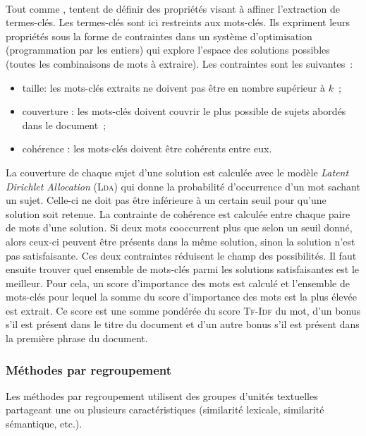         \label{subsubsec:main-state_of_the_art-automatic_keyphrase_extraction-unsupervised_keyphrase_extraction-statistical_approaches:ilp}
        ~\\Tout comme ,
         tentent de définir des
        propriétés visant à affiner l'extraction de termes-clés. Les termes-clés
        sont ici restreints aux mots-clés. Ils expriment leurs propriétés sous
        la forme de contraintes dans un système d'optimisation (programmation
        par les entiers) qui explore l'espace des solutions possibles (toutes
        les combinaisons de mots à extraire). Les contraintes sont les
        suivantes~:
        \begin{itemize}
          \item{taille: les mots-clés extraits ne doivent pas être en nombre
                supérieur à $k$~;}
          \item{couverture : les mots-clés doivent couvrir le plus possible de
                sujets abordés dans le document~;}
          \item{cohérence : les mots-clés doivent être cohérents entre eux.}
        \end{itemize}
        La couverture de chaque sujet d'une solution est calculée avec le modèle
        \textit{Latent Dirichlet Allocation} (\textsc{Lda}) \cite{blei2003lda}
        qui donne la probabilité d'occurrence d'un mot sachant un sujet.
        Celle-ci ne doit pas être inférieure à un certain seuil pour qu'une
        solution soit retenue. La contrainte de cohérence est calculée entre
        chaque paire de mots d'une solution. Si deux mots cooccurrent plus que
        selon un seuil donné, alors ceux-ci peuvent être présents dans la même
        solution, sinon la solution n'est pas satisfaisante. Ces deux
        contraintes réduisent le champ des possibilités. Il faut ensuite
        trouver quel ensemble de mots-clés parmi les solutions satisfaisantes
        est le meilleur. Pour cela, un score d'importance des mots est calculé
        et l'ensemble de mots-clés pour lequel la somme du score d'importance
        des mots est la plus élevée est extrait. Ce score est une somme pondérée
        du score \textsc{Tf-Idf} du mot, d'un bonus s'il est présent dans le
        titre du document et d'un autre bonus s'il est présent dans la première
        phrase du document.

      \subsubsection{Méthodes par regroupement}
      \label{subsubsec:main-state_of_the_art-automatic_keyphrase_extraction-unsupervised_keyphrase_extraction-clustering_approaches}
        Les méthodes par regroupement utilisent des groupes d'unités textuelles
        partageant une ou plusieurs caractéristiques (similarité lexicale,
        similarité sémantique, etc.).

